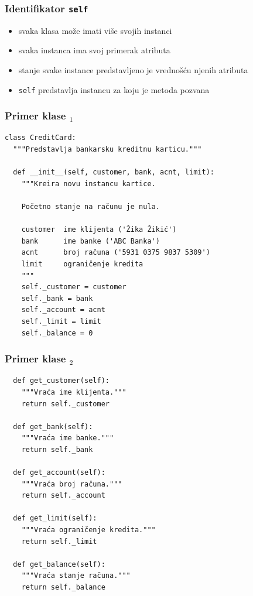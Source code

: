 \documentclass[compress,aspectratio=169]{beamer}
\begin{document}
\begin{frame}[fragile]
  \frametitle{Identifikator \texttt{self}}
  \begin{itemize}
    \item svaka klasa može imati više svojih instanci
    \item svaka instanca ima svoj primerak atributa
    \item stanje svake instance predstavljeno je vrednošću njenih atributa
    \item \texttt{self} predstavlja instancu za koju je metoda pozvana 
  \end{itemize}
\end{frame}

\begin{frame}[fragile,shrink=10]
  \frametitle{Primer klase $_{1}$}
\begin{verbatim}
class CreditCard:
  """Predstavlja bankarsku kreditnu karticu."""
  
  def __init__(self, customer, bank, acnt, limit):
    """Kreira novu instancu kartice.
    
    Početno stanje na računu je nula.
    
    customer  ime klijenta ('Žika Žikić')
    bank      ime banke ('ABC Banka')
    acnt      broj računa ('5931 0375 9837 5309')
    limit     ograničenje kredita
    """
    self._customer = customer
    self._bank = bank
    self._account = acnt
    self._limit = limit
    self._balance = 0
\end{verbatim}
\end{frame}

\begin{frame}[fragile,shrink=10]
  \frametitle{Primer klase $_{2}$}
\begin{verbatim}
  def get_customer(self):
    """Vraća ime klijenta."""
    return self._customer

  def get_bank(self):
    """Vraća ime banke."""
    return self._bank

  def get_account(self):
    """Vraća broj računa."""
    return self._account

  def get_limit(self):
    """Vraća ograničenje kredita."""
    return self._limit

  def get_balance(self):
    """Vraća stanje računa."""
    return self._balance
\end{verbatim}
\end{frame}
\end{document}
